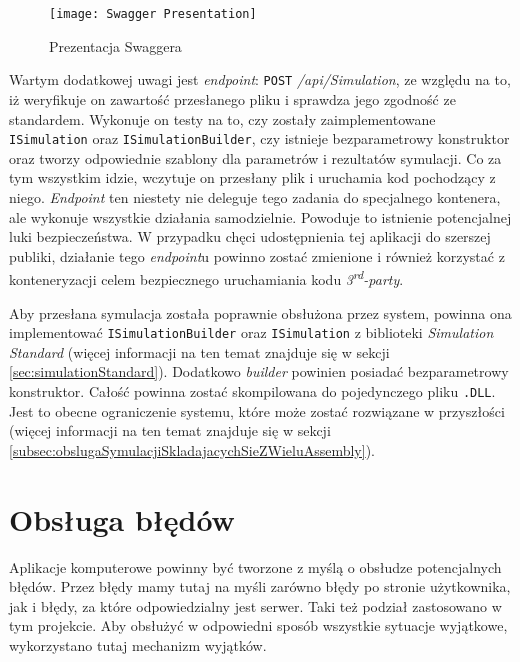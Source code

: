 \begin{figure}[H]
	\texttt{[image: Swagger Presentation]}
	\caption{Prezentacja Swaggera}
\end{figure}

\par Wartym dodatkowej uwagi jest \emph{endpoint}: \texttt{POST} \emph{/api/Simulation}, ze względu na to, iż weryfikuje on zawartość przesłanego pliku i sprawdza jego zgodność ze standardem. Wykonuje on testy na to, czy zostały zaimplementowane \texttt{ISimulation} oraz \texttt{ISimulationBuilder}, czy istnieje bezparametrowy konstruktor oraz tworzy odpowiednie szablony dla parametrów i rezultatów symulacji. Co za tym wszystkim idzie, wczytuje on przesłany plik i uruchamia kod pochodzący z niego. \emph{Endpoint} ten niestety nie deleguje tego zadania do specjalnego kontenera, ale wykonuje wszystkie działania samodzielnie. Powoduje to istnienie potencjalnej luki bezpieczeństwa. W przypadku chęci udostępnienia tej aplikacji do szerszej publiki, działanie tego \emph{endpoint}u powinno zostać zmienione i również korzystać z konteneryzacji celem bezpiecznego uruchamiania kodu \emph{3\textsuperscript{rd}-party}.

\par Aby przesłana symulacja została poprawnie obsłużona przez system, powinna ona implementować \texttt{ISimulationBuilder} oraz \texttt{ISimulation} z biblioteki \emph{Simulation Standard} (więcej informacji na ten temat znajduje się w sekcji \ref{sec:simulationStandard}). Dodatkowo \emph{builder} powinien posiadać bezparametrowy konstruktor. Całość powinna zostać skompilowana do pojedynczego pliku \texttt{.DLL}. Jest to obecne ograniczenie systemu, które może zostać rozwiązane w przyszłości (więcej informacji na ten temat znajduje się w sekcji \ref{subsec:obslugaSymulacjiSkladajacychSieZWieluAssembly}).

\section{Obsługa błędów}

\par Aplikacje komputerowe powinny być tworzone z myślą o obsłudze potencjalnych błędów. Przez błędy mamy tutaj na myśli zarówno błędy po stronie użytkownika, jak i błędy, za które odpowiedzialny jest serwer. Taki też podział zastosowano w tym projekcie. Aby obsłużyć w odpowiedni sposób wszystkie sytuacje wyjątkowe, wykorzystano tutaj mechanizm wyjątków.

